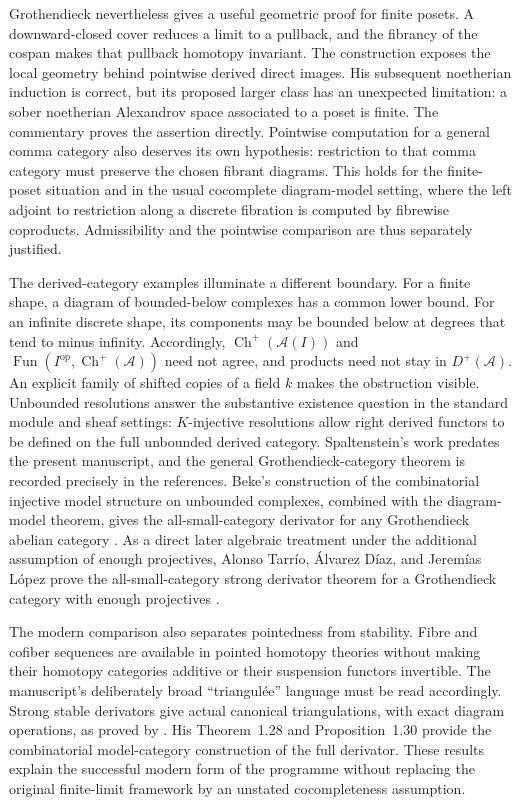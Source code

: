 Grothendieck nevertheless gives a useful geometric proof for finite posets. A downward-closed cover reduces a limit to a pullback, and the fibrancy of the cospan makes that pullback homotopy invariant. The construction exposes the local geometry behind pointwise derived direct images. His subsequent noetherian induction is correct, but its proposed larger class has an unexpected limitation: a sober noetherian Alexandrov space associated to a poset is finite. The commentary proves the assertion directly. Pointwise computation for a general comma category also deserves its own hypothesis: restriction to that comma category must preserve the chosen fibrant diagrams. This holds for the finite-poset situation and in the usual cocomplete diagram-model setting, where the left adjoint to restriction along a discrete fibration is computed by fibrewise coproducts. Admissibility and the pointwise comparison are thus separately justified.

The derived-category examples illuminate a different boundary. For a finite shape, a diagram of bounded-below complexes has a common lower bound. For an infinite discrete shape, its components may be bounded below at degrees that tend to minus infinity. Accordingly, $\operatorname{Ch}^+(\mathcal A(I))$ and $\operatorname{Fun}(I^{\mathrm{op}},\operatorname{Ch}^+(\mathcal A))$ need not agree, and products need not stay in $D^+(\mathcal A)$. An explicit family of shifted copies of a field $k$ makes the obstruction visible. Unbounded resolutions answer the substantive existence question in the standard module and sheaf settings: $K$-injective resolutions allow right derived functors to be defined on the full unbounded derived category. Spaltenstein's work predates the present manuscript, and the general Grothendieck-category theorem is recorded precisely in the references. Beke's construction of the combinatorial injective model structure on unbounded complexes, combined with the diagram-model theorem, gives the all-small-category derivator for any Grothendieck abelian category \citep[Proposition~3.13]{Beke2000}. As a direct later algebraic treatment under the additional assumption of enough projectives, Alonso Tarr\'io, \'Alvarez D\'iaz, and Jerem\'ias L\'opez prove the all-small-category strong derivator theorem for a Grothendieck category with enough projectives \citep[Theorem~3.4, arXiv version~3]{AlonsoAlvarezJeremias2023}.

The modern comparison also separates pointedness from stability. Fibre and cofiber sequences are available in pointed homotopy theories without making their homotopy categories additive or their suspension functors invertible. The manuscript's deliberately broad ``triangul\'ee'' language must be read accordingly. Strong stable derivators give actual canonical triangulations, with exact diagram operations, as proved by \citet[Theorem~4.16 and Proposition~4.18]{Groth2013}. His Theorem~1.28 and Proposition~1.30 provide the combinatorial model-category construction of the full derivator. These results explain the successful modern form of the programme without replacing the original finite-limit framework by an unstated cocompleteness assumption.

